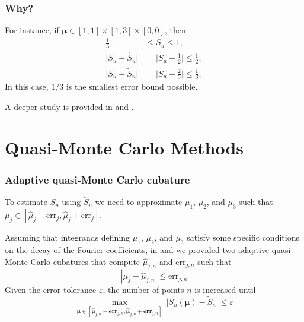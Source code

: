 \documentclass[11pt,compress]{beamer} %
\begin{document}
\begin{frame}
\frametitle{Why?}

For instance, if $\boldsymbol{\mu}\in[1,1]\times[1,3]\times[0,0]$, then
\begin{align*}
\frac{1}{3} & \le S_u \le 1, \\
\bigl |S_u - \widehat{S}_{u} \bigr | & = \biggl |S_u - \frac 12 \biggr |\leq \frac 12 , \\
\bigl |S_u - \widetilde{S}_{u} \bigr | & = \biggl |S_u -\frac 23 \biggl |\leq \frac 13,
\end{align*}
In this case, $1/3$ is the smallest error bound possible.

A deeper study is provided in \cite{HicEtal17a} and \cite{GilJim16b}.
\end{frame}

\section{Quasi-Monte Carlo Methods}

\begin{frame}
\frametitle{Adaptive quasi-Monte Carlo cubature}
To estimate $S_{u}$ using $\widetilde{S}_u$ we need to approximate $\mu_1$, 
$\mu_2$, 
and $\mu_3$ such that $\mu_j\in[\widehat{\mu}_j-\text{err}_j, 
\widehat{\mu}_j+\text{err}_j]$.

Assuming that integrands defining $\mu_1$, $\mu_2$, and $\mu_3$ satisfy some 
specific 
conditions on the decay of the Fourier coefficients, in \cite{HicJim16a} and 
\cite{JimHic16a} we provided two adaptive quasi-Monte Carlo cubatures that compute 
$\widehat{\mu}_{j,n}$ and $\text{err}_{j,n}$ such that
\begin{equation}\label{error_bound}
|\mu_j - \widehat{\mu}_{j,n}| \leq \text{err}_{j,n}
\end{equation}
Given the error tolerance $\varepsilon$, the number of points $n$ is increased until 
\[
\max_{\boldsymbol{\mu} 
	\in [\widehat{\boldsymbol{\mu}}_{j,n} - \textbf{err}_{j,n}, 
\widehat{\boldsymbol{\mu}}_{j,n} + \textbf{err}_{j,n}]} \
\bigl |S_u(\boldsymbol{\mu}) - \widetilde{S}_{u} \bigr | 
\le \varepsilon
\]
\end{frame}
\end{document}
